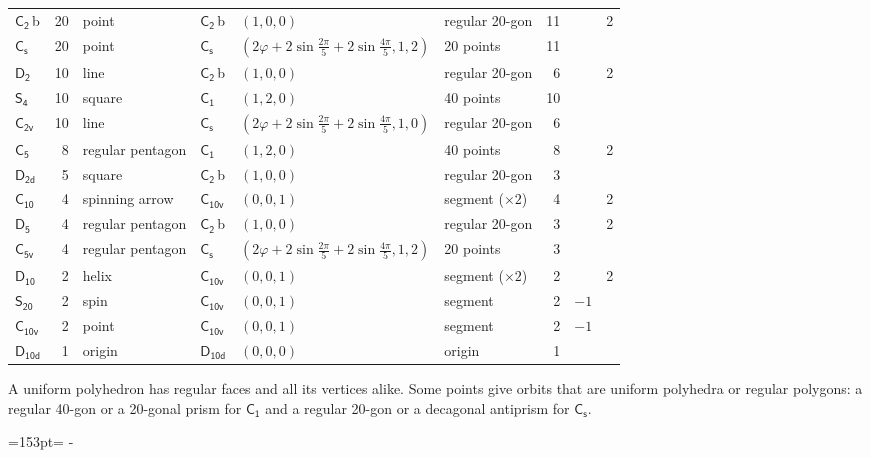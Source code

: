 \documentclass[10pt,a4paper]{article}
\newcommand{\needspace}[1]{\par\penalty-100\begingroup\dimen0=#1\relax\dimen2=\pagegoal
  \advance\dimen2-\pagetotal\ifdim\dimen0>\dimen2\relax\ifdim\dimen2>0pt\vfil\break\fi\fi
  \endgroup}
\numberwithin{equation}{section}
\newcommand{\grp}[1]{\mathsf{#1}}
\newcommand{\clsletter}[1]{\,{\scriptsize\color{black!55}#1}}
\newcommand{\goldenratio}{\varphi}
\newlength{\fillwidth}\newlength{\cellwidth}\newlength{\colwidth}
\begin{document}
{{\begin{longtable}{@{}lrllllr>{\RaggedRight\arraybackslash}p{\fillwidth}r@{}}
\href{C2.pdf}{$\grp{C_{2}}$}\clsletter{b} & 20 & point & \href{C2.pdf}{$\grp{C_{2}}$}\clsletter{b} & $(1, 0, 0)$ & regular 20-gon & 11 &  & 2\\
\href{C1v.pdf}{$\grp{C_{s}}$} & 20 & point & \href{C1v.pdf}{$\grp{C_{s}}$} & $(2\goldenratio + 2\sin\tfrac{2\pi}{5} + 2\sin\tfrac{4\pi}{5}, 1, 2)$ & 20 points & 11 &  & \\
\href{D2.pdf}{$\grp{D_{2}}$} & 10 & line & \href{C2.pdf}{$\grp{C_{2}}$}\clsletter{b} & $(1, 0, 0)$ & regular 20-gon & 6 &  & 2\\
\href{S4.pdf}{$\grp{S_{4}}$} & 10 & square & \href{C1.pdf}{$\grp{C_{1}}$} & $(1, 2, 0)$ & 40 points & 10 &  & \\
\href{C2v.pdf}{$\grp{C_{2v}}$} & 10 & line & \href{C1v.pdf}{$\grp{C_{s}}$} & $(2\goldenratio + 2\sin\tfrac{2\pi}{5} + 2\sin\tfrac{4\pi}{5}, 1, 0)$ & regular 20-gon & 6 &  & \\
\href{C5.pdf}{$\grp{C_{5}}$} & 8 & regular pentagon & \href{C1.pdf}{$\grp{C_{1}}$} & $(1, 2, 0)$ & 40 points & 8 &  & 2\\
\href{D2d.pdf}{$\grp{D_{2d}}$} & 5 & square & \href{C2.pdf}{$\grp{C_{2}}$}\clsletter{b} & $(1, 0, 0)$ & regular 20-gon & 3 &  & \\
\href{C10.pdf}{$\grp{C_{10}}$} & 4 & spinning arrow & \href{C10v.pdf}{$\grp{C_{10v}}$} & $(0, 0, 1)$ & segment (${\times}2$) & 4 &  & 2\\
\href{D5.pdf}{$\grp{D_{5}}$} & 4 & regular pentagon & \href{C2.pdf}{$\grp{C_{2}}$}\clsletter{b} & $(1, 0, 0)$ & regular 20-gon & 3 &  & 2\\
\href{C5v.pdf}{$\grp{C_{5v}}$} & 4 & regular pentagon & \href{C1v.pdf}{$\grp{C_{s}}$} & $(2\goldenratio + 2\sin\tfrac{2\pi}{5} + 2\sin\tfrac{4\pi}{5}, 1, 2)$ & 20 points & 3 &  & \\
\href{D10.pdf}{$\grp{D_{10}}$} & 2 & helix & \href{C10v.pdf}{$\grp{C_{10v}}$} & $(0, 0, 1)$ & segment (${\times}2$) & 2 &  & 2\\
\href{S20.pdf}{$\grp{S_{20}}$} & 2 & spin & \href{C10v.pdf}{$\grp{C_{10v}}$} & $(0, 0, 1)$ & segment & 2 & ${-1}$ & \\
\href{C10v.pdf}{$\grp{C_{10v}}$} & 2 & point & \href{C10v.pdf}{$\grp{C_{10v}}$} & $(0, 0, 1)$ & segment & 2 & ${-1}$ & \\*
\href{D10d.pdf}{$\grp{D_{10d}}$} & 1 & origin & \href{D10d.pdf}{$\grp{D_{10d}}$} & $(0, 0, 0)$ & origin & 1 &  & \\
\bottomrule\end{longtable}}}
A uniform polyhedron has regular faces and all its vertices alike. Some points give orbits that are uniform polyhedra or regular polygons: a regular 40-gon or a 20-gonal prism for \href{C1.pdf}{$\grp{C_{1}}$} and a regular 20-gon or a decagonal antiprism for \href{C1v.pdf}{$\grp{C_{s}}$}.
\needspace{153pt}
\end{document}

